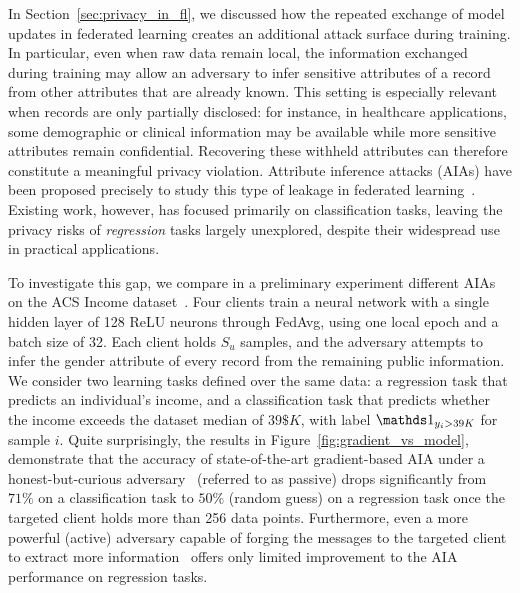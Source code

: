 In Section~\ref{sec:privacy_in_fl}, we discussed how the repeated exchange of model updates in federated learning creates an additional attack surface during training. In particular, even when raw data remain local, the information exchanged during training may allow an adversary to infer sensitive attributes of a record from other attributes that are already known. This setting is especially relevant when records are only partially disclosed: for instance, in healthcare applications, some demographic or clinical information may be available while more sensitive attributes remain confidential. Recovering these withheld attributes can therefore constitute a meaningful privacy violation. Attribute inference attacks (AIAs) have been proposed precisely to study this type of leakage in federated learning~\cite{lyu2021novelattributereconstructionattack,chen2024practical}. Existing work, however, has focused primarily on classification tasks, leaving the privacy risks of \textit{regression} tasks largely unexplored, despite their widespread use in practical applications.

To investigate this gap, we compare in a preliminary experiment different AIAs on the ACS Income dataset~\cite{income_dataset}. Four clients train a neural network with a single hidden layer of 128 ReLU neurons through FedAvg, using one local epoch and a batch size of 32. Each client holds $S_u$ samples, and the adversary attempts to infer the gender attribute of every record from the remaining public information. We consider two learning tasks defined over the same data: a regression task that predicts an individual’s income, and a classification task that predicts whether the income exceeds the dataset median of $39\$K$, with label $\indicator_{y_i>39K}$ for sample $i$.
Quite surprisingly, the results in Figure~\ref{fig:gradient_vs_model}, demonstrate that the accuracy of state-of-the-art gradient-based AIA under a honest-but-curious adversary~\cite{lyu2021novelattributereconstructionattack, chen2024practical} (referred to as passive) drops significantly from $71\%$ on a classification task to $50\%$ (random guess) on a regression task once the targeted client holds more than 256 data points.
Furthermore,  even a more powerful (active) adversary capable of forging the messages to the targeted client to extract more information~\cite{lyu2021novelattributereconstructionattack, chen2024practical} offers only limited improvement to the AIA performance on regression tasks.


